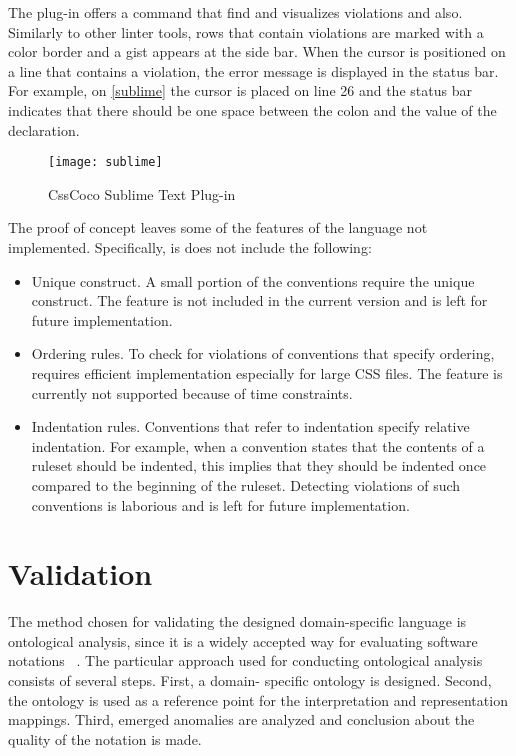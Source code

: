 The plug-in offers a command that find and visualizes violations and also. Similarly to
other linter tools, rows that contain violations are marked with a color
border and a gist appears at the side bar. When the cursor is positioned on a
line that contains a violation, the error message is displayed in the status
bar. For example, on \autoref{sublime} the cursor is placed on line 26 and the
status bar indicates that there should be one space between the colon and the
value of the declaration.

\begin{figure}[h!]
  \centering
  \caption{
    \label{sublime}
    CssCoco Sublime Text Plug-in}
  \texttt{[image: sublime]}
\end{figure}

The proof of concept leaves some of the features of the language not implemented. Specifically, is does not include the following:

\begin{itemize}

\item Unique construct. A small portion of the conventions require the unique construct. The feature is not included in the current version and is left for future implementation.

\item Ordering rules. To check for violations of conventions that specify ordering, requires efficient implementation especially for large CSS files. The feature is currently not supported because of time constraints. 

\item Indentation rules. Conventions that refer to indentation specify relative indentation. For example, when a convention states that the contents of a ruleset should be indented, this implies that they should be indented once compared to the beginning of the ruleset. Detecting violations of such conventions is laborious and is left for future implementation.


\end{itemize}

\section{Validation}

The method chosen for validating the designed domain-specific language is
ontological analysis, since it is a widely accepted way for evaluating
software notations ~\cite{opdahl2002ontological,green2000integrated,moody2009physics,parsons1997using,weber1996analytical}. The particular approach used for
conducting ontological analysis consists of several steps. First, a domain-
specific ontology is designed. Second, the ontology is used as a reference
point for the interpretation and representation mappings. Third, emerged
anomalies are analyzed and conclusion about the quality of the notation is
made.

